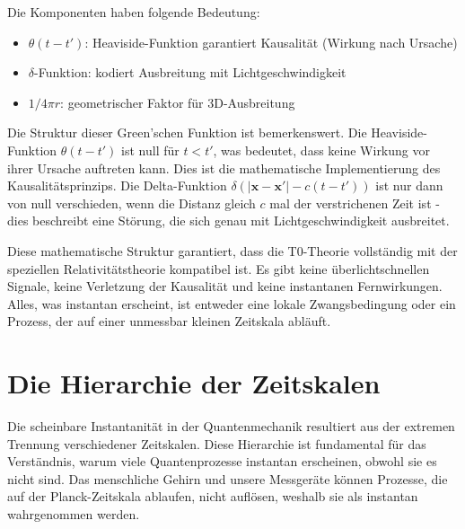 \documentclass[12pt,a4paper]{article}
\begin{document}
	Die Komponenten haben folgende Bedeutung:
	\begin{itemize}
		\item $\theta(t-t')$: Heaviside-Funktion garantiert Kausalität (Wirkung nach Ursache)
		\item $\delta$-Funktion: kodiert Ausbreitung mit Lichtgeschwindigkeit
		\item $1/4\pi r$: geometrischer Faktor für 3D-Ausbreitung
	\end{itemize}
	
	Die Struktur dieser Green'schen Funktion ist bemerkenswert. Die Heaviside-Funktion $\theta(t-t')$ ist null für $t < t'$, was bedeutet, dass keine Wirkung vor ihrer Ursache auftreten kann. Dies ist die mathematische Implementierung des Kausalitätsprinzips. Die Delta-Funktion $\delta(|\mathbf{x}-\mathbf{x}'| - c(t-t'))$ ist nur dann von null verschieden, wenn die Distanz gleich $c$ mal der verstrichenen Zeit ist - dies beschreibt eine Störung, die sich genau mit Lichtgeschwindigkeit ausbreitet.
	
	Diese mathematische Struktur garantiert, dass die T0-Theorie vollständig mit der speziellen Relativitätstheorie kompatibel ist. Es gibt keine überlichtschnellen Signale, keine Verletzung der Kausalität und keine instantanen Fernwirkungen. Alles, was instantan erscheint, ist entweder eine lokale Zwangsbedingung oder ein Prozess, der auf einer unmessbar kleinen Zeitskala abläuft.
	
	\section{Die Hierarchie der Zeitskalen}
	
	Die scheinbare Instantanität in der Quantenmechanik resultiert aus der extremen Trennung verschiedener Zeitskalen. Diese Hierarchie ist fundamental für das Verständnis, warum viele Quantenprozesse instantan erscheinen, obwohl sie es nicht sind. Das menschliche Gehirn und unsere Messgeräte können Prozesse, die auf der Planck-Zeitskala ablaufen, nicht auflösen, weshalb sie als instantan wahrgenommen werden.
	
\end{document}
